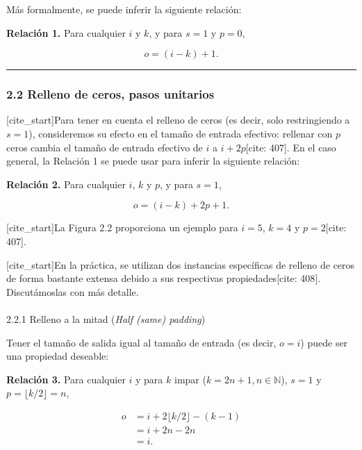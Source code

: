 \documentclass[
  super,
  preprint,
  3p]{elsarticle}
\makeatletter
\let\oldparagraph\paragraph
\renewcommand{\paragraph}{
    \@ifstar
      \xxxParagraphStar
      \xxxParagraphNoStar
  }
\newcommand{\xxxParagraphStar}[1]{\oldparagraph*{#1}\mbox{}}
\newcommand{\xxxParagraphNoStar}[1]{\oldparagraph{#1}\mbox{}}
\makeatother
\begin{document}
Más formalmente, se puede inferir la siguiente relación:

\textbf{Relación 1.} Para cualquier \(i\) y \(k\), y para \(s = 1\) y
\(p = 0\),

\[o = (i - k) + 1.\]

\begin{center}\rule{0.5\linewidth}{0.5pt}\end{center}

\subsubsection{2.2 Relleno de ceros, pasos
unitarios}\label{relleno-de-ceros-pasos-unitarios}

{[}cite\_start{]}Para tener en cuenta el relleno de ceros (es decir,
solo restringiendo a \(s = 1\)), consideremos su efecto en el tamaño de
entrada efectivo: rellenar con \(p\) ceros cambia el tamaño de entrada
efectivo de \(i\) a \(i + 2p\){[}cite: 407{]}. En el caso general, la
Relación 1 se puede usar para inferir la siguiente relación:

\textbf{Relación 2.} Para cualquier \(i\), \(k\) y \(p\), y para
\(s = 1\),

\[o = (i - k) + 2p + 1.\]

{[}cite\_start{]}La Figura 2.2 proporciona un ejemplo para \(i = 5\),
\(k = 4\) y \(p = 2\){[}cite: 407{]}.

{[}cite\_start{]}En la práctica, se utilizan dos instancias específicas
de relleno de ceros de forma bastante extensa debido a sus respectivas
propiedades{[}cite: 408{]}. Discutámoslas con más detalle.

\paragraph{\texorpdfstring{2.2.1 Relleno a la mitad (\emph{Half (same)
padding})}{2.2.1 Relleno a la mitad (Half (same) padding)}}\label{relleno-a-la-mitad-half-same-padding}

Tener el tamaño de salida igual al tamaño de entrada (es decir,
\(o = i\)) puede ser una propiedad deseable:

\textbf{Relación 3.} Para cualquier \(i\) y para \(k\) impar
(\(k = 2n + 1, n \in \mathbb{N}\)), \(s = 1\) y
\(p = \lfloor k/2 \rfloor = n\),

\[
\begin{aligned}
o &= i + 2\lfloor k/2 \rfloor - (k - 1) \\
&= i + 2n - 2n \\
&= i.
\end{aligned}
\]
\end{document}
